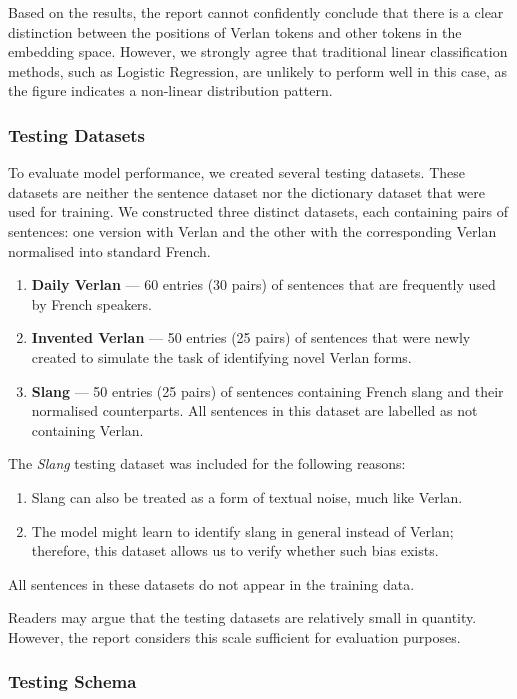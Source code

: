 \documentclass[12pt]{article}
\begin{document}
Based on the results, the report cannot confidently conclude that there is a clear distinction between the positions of Verlan tokens and other tokens in the embedding space. 
However, we strongly agree that traditional linear classification methods, such as Logistic Regression, are unlikely to perform well in this case, as the figure indicates a non-linear distribution pattern.

\subsubsection{Testing Datasets}
To evaluate model performance, we created several testing datasets. 
These datasets are neither the sentence dataset nor the dictionary dataset that were used for training. 
We constructed three distinct datasets, each containing pairs of sentences: one version with Verlan and the other with the corresponding Verlan normalised into standard French.

\begin{enumerate}
  \item \textbf{Daily Verlan} --- 60 entries (30 pairs) of sentences that are frequently used by French speakers.
  \item \textbf{Invented Verlan} --- 50 entries (25 pairs) of sentences that were newly created to simulate the task of identifying novel Verlan forms.
  \item \textbf{Slang} --- 50 entries (25 pairs) of sentences containing French slang and their normalised counterparts. All sentences in this dataset are labelled as not containing Verlan.
\end{enumerate}

The \textit{Slang} testing dataset was included for the following reasons:
\begin{enumerate}
  \item Slang can also be treated as a form of textual noise, much like Verlan.
  \item The model might learn to identify slang in general instead of Verlan; therefore, this dataset allows us to verify whether such bias exists.
\end{enumerate}

All sentences in these datasets do not appear in the training data.

Readers may argue that the testing datasets are relatively small in quantity. 
However, the report considers this scale sufficient for evaluation purposes.

\subsubsection{Testing Schema}
\end{document}
